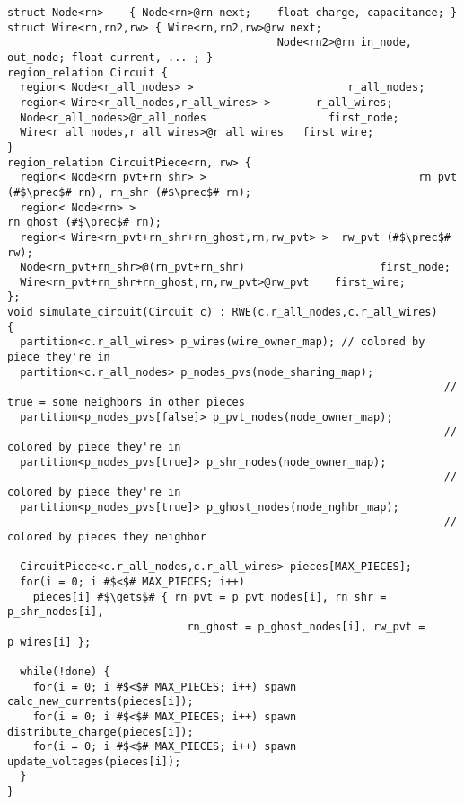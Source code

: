 \begin{lstlisting}[float,caption={Circuit Simulation Code Example}]
struct Node<rn>    { Node<rn>@rn next;    float charge, capacitance; }
struct Wire<rn,rn2,rw> { Wire<rn,rn2,rw>@rw next;
                                          Node<rn2>@rn in_node, out_node; float current, ... ; }
region_relation Circuit {
  region< Node<r_all_nodes> >                        r_all_nodes;
  region< Wire<r_all_nodes,r_all_wires> >       r_all_wires;
  Node<r_all_nodes>@r_all_nodes                   first_node;
  Wire<r_all_nodes,r_all_wires>@r_all_wires   first_wire;
}
region_relation CircuitPiece<rn, rw> {
  region< Node<rn_pvt+rn_shr> >                                 rn_pvt (#$\prec$# rn), rn_shr (#$\prec$# rn);
  region< Node<rn> >                                                   rn_ghost (#$\prec$# rn);
  region< Wire<rn_pvt+rn_shr+rn_ghost,rn,rw_pvt> >  rw_pvt (#$\prec$# rw);
  Node<rn_pvt+rn_shr>@(rn_pvt+rn_shr)                     first_node;
  Wire<rn_pvt+rn_shr+rn_ghost,rn,rw_pvt>@rw_pvt    first_wire;
};
void simulate_circuit(Circuit c) : RWE(c.r_all_nodes,c.r_all_wires)
{
  partition<c.r_all_wires> p_wires(wire_owner_map); // colored by piece they're in
  partition<c.r_all_nodes> p_nodes_pvs(node_sharing_map);
                                                                    // true = some neighbors in other pieces
  partition<p_nodes_pvs[false]> p_pvt_nodes(node_owner_map);
                                                                    // colored by piece they're in
  partition<p_nodes_pvs[true]> p_shr_nodes(node_owner_map);
                                                                    // colored by piece they're in
  partition<p_nodes_pvs[true]> p_ghost_nodes(node_nghbr_map);
                                                                    // colored by pieces they neighbor

  CircuitPiece<c.r_all_nodes,c.r_all_wires> pieces[MAX_PIECES];
  for(i = 0; i #$<$# MAX_PIECES; i++) 
    pieces[i] #$\gets$# { rn_pvt = p_pvt_nodes[i], rn_shr = p_shr_nodes[i],
                            rn_ghost = p_ghost_nodes[i], rw_pvt = p_wires[i] };

  while(!done) {
    for(i = 0; i #$<$# MAX_PIECES; i++) spawn calc_new_currents(pieces[i]);
    for(i = 0; i #$<$# MAX_PIECES; i++) spawn distribute_charge(pieces[i]);
    for(i = 0; i #$<$# MAX_PIECES; i++) spawn update_voltages(pieces[i]);
  }
}


\end{lstlisting}
